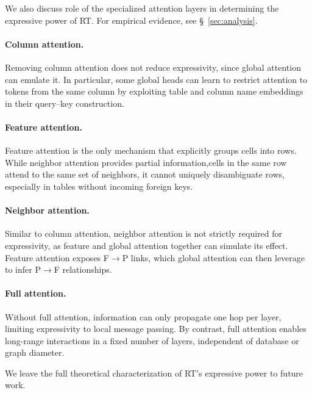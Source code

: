 We also discuss role of the specialized attention layers in determining the expressive power of RT.  
For empirical evidence, see \S~\ref{sec:analysis}.

\paragraph{Column attention.}
Removing column attention does not reduce expressivity, since global attention can emulate it.  
In particular, some global heads can learn to restrict attention to tokens from the same column by exploiting table and column name embeddings in their query–key construction.

\paragraph{Feature attention.}
Feature attention is the only mechanism that explicitly groups cells into rows.  
While neighbor attention provides partial information,cells in the same row attend to the same set of neighbors, it cannot uniquely disambiguate rows, especially in tables without incoming foreign keys.

\paragraph{Neighbor attention.}
Similar to column attention, neighbor attention is not strictly required for expressivity, as feature and global attention together can simulate its effect.  
Feature attention exposes F$\to$P links, which global attention can then leverage to infer P$\to$F relationships. %

\paragraph{Full attention.}
Without full attention, information can only propagate one hop per layer, limiting expressivity to local message passing.  
By contrast, full attention enables long-range interactions in a fixed number of layers, independent of database or graph diameter.

We leave the full theoretical characterization of RT’s expressive power to future work.



